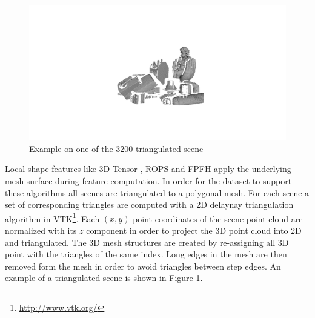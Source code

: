 \documentclass[10pt,twocolumn,letterpaper]{article}
\begin{document}
\begin{figure}[ht]
\centering
\includegraphics[clip, trim=14cm 6cm 13cm 8cm,width=1.0\linewidth, height= 1.0\linewidth, keepaspectratio]{img/mesh_scene.png}
\caption{Example on one of the 3200 triangulated scene}
\label{fig:mesh_scene}
\end{figure}
Local shape features like 3D Tensor \cite{Mian2006}, ROPS \cite{Guo2013} and FPFH \cite{Fpfh2009} apply the underlying mesh surface during feature computation. In order for the dataset to support these algorithms all scenes are triangulated to a polygonal mesh. For each scene a set of corresponding triangles are computed with a 2D delaynay triangulation algorithm in VTK\footnote{\url{http://www.vtk.org/}}. Each $(x,y)$ point coordinates of the scene point cloud are normalized with its $z$ component in order to project the 3D point cloud into 2D and triangulated. The 3D mesh structures are created by re-assigning all 3D point with the triangles of the same index. Long edges in the mesh are then removed form the mesh in order to avoid triangles between step edges. An example of a triangulated scene is shown in Figure \ref{fig:mesh_scene}.
\end{document}
